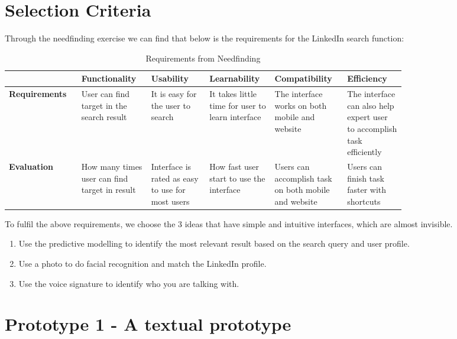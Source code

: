 \documentclass[
	letterpaper, %
]{jdf}
\begin{document}
\section{Selection Criteria}
Through the needfinding exercise we can find that below is the requirements for the LinkedIn search function:
\begin{table}[h] %
	\caption{Requirements from Needfinding}
	\small %
	\centering %
	\begin{tabular}{L{0.13\linewidth} L{0.13\linewidth} L{0.13\linewidth} L{0.13\linewidth} L{0.13\linewidth} L{0.13\linewidth}}
		\textbf{\-} & \textbf{Functionality} & \textbf{Usability} & \textbf{Learnability} & \textbf{Compatibility} & \textbf{Efficiency}\\
		\toprule[0.5pt]
		\textbf{Requirements} & User can find target in the search result & It is easy for the user to search & It takes little time for user to learn interface & The interface works on both mobile and website & The interface can also help expert user to accomplish task efficiently \\
		\midrule
		\textbf{Evaluation} & How many times user can find target in result & Interface is rated as easy to use for most users & How fast user start to use the interface & Users can accomplish task on both mobile and website & Users can finish task faster with shortcuts \\
	\end{tabular}
\end{table}

To fulfil the above requirements, we choose the 3 ideas that have simple and intuitive interfaces, which are almost invisible.

\begin{enumerate}
    \item Use the predictive modelling to identify the most relevant result based on the search query and user profile.
    \item Use a photo to do facial recognition and match the LinkedIn profile.
    \item Use the voice signature to identify who you are talking with.
\end{enumerate}

\section{Prototype 1 - A textual prototype}
\end{document}
